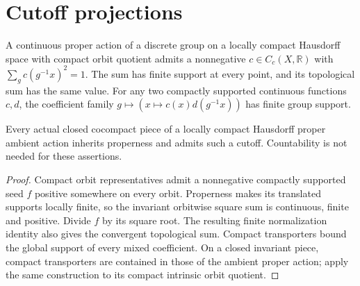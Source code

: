 \section{Cutoff projections}
\begin{proposition}\label{prop:proper-cocompact-cutoff}
\leanok
A continuous proper action of a discrete group on a locally compact
Hausdorff space with compact orbit quotient admits a nonnegative
$c\in C_c(X,\mathbb R)$ with
$\sum_g c(g^{-1}x)^2=1$. The sum has finite support at every point,
and its topological sum has the same value. For any two compactly
supported continuous functions $c,d$, the coefficient family
$g\mapsto(x\mapsto c(x)d(g^{-1}x))$ has finite group support.

Every actual closed cocompact piece of a locally compact Hausdorff
proper ambient action inherits properness and admits such a cutoff.
Countability is not needed for these assertions.
\end{proposition}
\begin{proof}
\leanok
Compact orbit representatives admit a nonnegative compactly supported
seed $f$ positive somewhere on every orbit. Properness makes its
translated supports locally finite, so the invariant orbitwise square
sum is continuous, finite and positive. Divide $f$ by its square root.
The resulting finite normalization identity also gives the convergent
topological sum. Compact transporters bound the global support of every
mixed coefficient. On a closed invariant piece, compact transporters
are contained in those of the ambient proper action; apply the same
construction to its compact intrinsic orbit quotient.
\end{proof}

